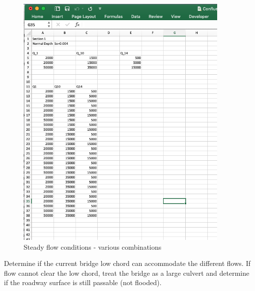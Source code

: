\documentclass[12pt]{article}
\begin{document}
\begin{figure}[h!] %
   \centering
   \includegraphics[height=5in]{steady-flow-conditions.png} 
   \caption{Steady flow conditions - various combinations}
   \label{fig:steady-flow-conditions}
\end{figure}
Determine if the current bridge low chord can accommodate the different flows. 
If flow cannot clear the low chord, treat the bridge as a large culvert and determine if the roadway surface is still passable (not flooded).
\end{document}
